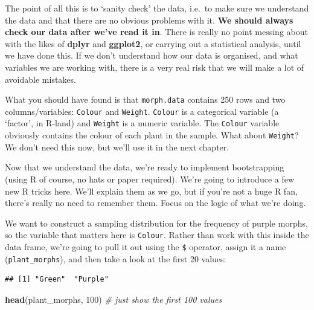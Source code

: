 \documentclass[]{book}
\newenvironment{Shaded}{\begin{snugshade}}{\end{snugshade}}
\newcommand{\KeywordTok}[1]{\textcolor[rgb]{0.13,0.29,0.53}{\textbf{{#1}}}}
\newcommand{\DecValTok}[1]{\textcolor[rgb]{0.00,0.00,0.81}{{#1}}}
\newcommand{\StringTok}[1]{\textcolor[rgb]{0.31,0.60,0.02}{{#1}}}
\newcommand{\CommentTok}[1]{\textcolor[rgb]{0.56,0.35,0.01}{\textit{{#1}}}}
\newcommand{\NormalTok}[1]{{#1}}
\begin{document}
The point of all this is to `sanity check' the data, i.e.~to make sure
we understand the data and that there are no obvious problems with it.
\textbf{We should always check our data after we've read it in}. There
is really no point messing about with the likes of \textbf{dplyr} and
\textbf{ggplot2}, or carrying out a statistical analysis, until we have
done this. If we don't understand how our data is organised, and what
variables we are working with, there is a very real risk that we will
make a lot of avoidable mistakes.

What you should have found is that \texttt{morph.data} contains 250 rows
and two columns/variables: \texttt{Colour} and \texttt{Weight}.
\texttt{Colour} is a categorical variable (a `factor', in R-land) and
\texttt{Weight} is a numeric variable. The \texttt{Colour} variable
obviously contains the colour of each plant in the sample. What about
\texttt{Weight}? We don't need this now, but we'll use it in the next
chapter.

Now that we understand the data, we're ready to implement bootstrapping
(using R of course, no hats or paper required). We're going to introduce
a few new R tricks here. We'll explain them as we go, but if you're not
a huge R fan, there's really no need to remember them. Focus on the
logic of what we're doing.

We want to construct a sampling distribution for the frequency of purple
morphs, so the variable that matters here is \texttt{Colour}. Rather
than work with this inside the data frame, we're going to pull it out
using the \texttt{\$} operator, assign it a name
(\texttt{plant\_morphs}), and then take a look at the first 20 values:

\begin{Shaded}
\end{Shaded}

\begin{verbatim}
## [1] "Green"  "Purple"
\end{verbatim}

\begin{Shaded}
\begin{Highlighting}[]
\KeywordTok{head}\NormalTok{(plant_morphs, }\DecValTok{100}\NormalTok{) }\CommentTok{# just show the first 100 values}
\end{Highlighting}
\end{Shaded}
\end{document}
